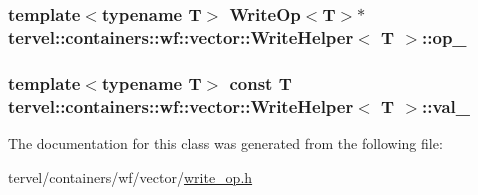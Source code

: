 \subsubsection[{op\+\_\+}]{\setlength{\rightskip}{0pt plus 5cm}template$<$typename T$>$ {\bf Write\+Op}$<$T$>$$\ast$ {\bf tervel\+::containers\+::wf\+::vector\+::\+Write\+Helper}$<$ T $>$\+::op\+\_\+\hspace{0.3cm}{\ttfamily [private]}}\label{classtervel_1_1containers_1_1wf_1_1vector_1_1_write_helper_a4e3aac7ec85299353af06f639f1ce49e}
\hypertarget{classtervel_1_1containers_1_1wf_1_1vector_1_1_write_helper_a5ccc8c44a16ff3d33c5472d0f149c771}{}
\subsubsection[{val\+\_\+}]{\setlength{\rightskip}{0pt plus 5cm}template$<$typename T$>$ const T {\bf tervel\+::containers\+::wf\+::vector\+::\+Write\+Helper}$<$ T $>$\+::val\+\_\+\hspace{0.3cm}{\ttfamily [private]}}\label{classtervel_1_1containers_1_1wf_1_1vector_1_1_write_helper_a5ccc8c44a16ff3d33c5472d0f149c771}


The documentation for this class was generated from the following file\+:\begin{DoxyCompactItemize}
\item 
tervel/containers/wf/vector/\hyperlink{write__op_8h}{write\+\_\+op.\+h}\end{DoxyCompactItemize}

